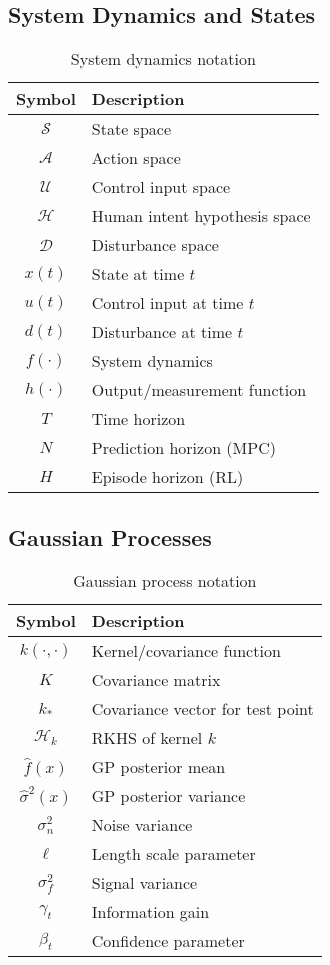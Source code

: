\subsection{System Dynamics and States}

\begin{table}[h]
\centering
\begin{tabular}{cl}
\toprule
\textbf{Symbol} & \textbf{Description} \\
\midrule
$\mathcal{S}$ & State space \\
$\mathcal{A}$ & Action space \\
$\mathcal{U}$ & Control input space \\
$\mathcal{H}$ & Human intent hypothesis space \\
$\mathcal{D}$ & Disturbance space \\
$x(t)$ & State at time $t$ \\
$u(t)$ & Control input at time $t$ \\
$d(t)$ & Disturbance at time $t$ \\
$f(\cdot)$ & System dynamics \\
$h(\cdot)$ & Output/measurement function \\
$T$ & Time horizon \\
$N$ & Prediction horizon (MPC) \\
$H$ & Episode horizon (RL) \\
\bottomrule
\end{tabular}
\caption{System dynamics notation}
\end{table}

\subsection{Gaussian Processes}

\begin{table}[h]
\centering
\begin{tabular}{cl}
\toprule
\textbf{Symbol} & \textbf{Description} \\
\midrule
$k(\cdot, \cdot)$ & Kernel/covariance function \\
$K$ & Covariance matrix \\
$k_*$ & Covariance vector for test point \\
$\mathcal{H}_k$ & RKHS of kernel $k$ \\
$\hat{f}(x)$ & GP posterior mean \\
$\hat{\sigma}^2(x)$ & GP posterior variance \\
$\sigma_n^2$ & Noise variance \\
$\ell$ & Length scale parameter \\
$\sigma_f^2$ & Signal variance \\
$\gamma_t$ & Information gain \\
$\beta_t$ & Confidence parameter \\
\bottomrule
\end{tabular}
\caption{Gaussian process notation}
\end{table}


